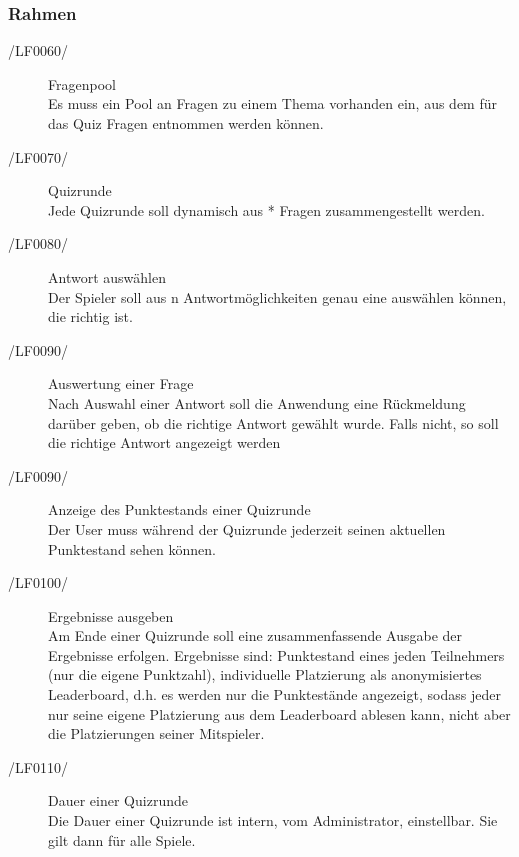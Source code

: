 \documentclass[11pt,a4paper]{scrreprt}
\begin{document}
\subsubsection{Rahmen}
\begin{description}
\item[/LF0060/] Fragenpool \\
Es muss ein Pool an Fragen zu einem Thema vorhanden ein, aus dem für das Quiz Fragen entnommen werden können.

\item[/LF0070/] Quizrunde \\
Jede Quizrunde soll dynamisch aus * Fragen zusammengestellt werden.

\item[/LF0080/] Antwort auswählen \\
Der Spieler soll aus n Antwortmöglichkeiten genau eine auswählen können, die richtig ist.
\item[/LF0090/]Auswertung einer Frage \\ 
Nach Auswahl einer Antwort soll die Anwendung eine Rückmeldung darüber geben, ob die richtige Antwort gewählt wurde. Falls nicht, so soll die richtige Antwort angezeigt werden

\item[/LF0090/]Anzeige des Punktestands einer Quizrunde \\ 
Der User muss während der Quizrunde jederzeit seinen aktuellen Punktestand sehen können.

\item[/LF0100/] Ergebnisse ausgeben \\
Am Ende einer Quizrunde soll eine zusammenfassende Ausgabe der Ergebnisse erfolgen. Ergebnisse sind: Punktestand eines jeden Teilnehmers (nur die eigene Punktzahl),  individuelle Platzierung als anonymisiertes Leaderboard, d.h. es werden nur die Punktestände angezeigt, sodass jeder nur seine eigene Platzierung aus dem Leaderboard ablesen kann, nicht aber die Platzierungen seiner Mitspieler.

\item[/LF0110/] Dauer einer Quizrunde \\
 Die Dauer einer Quizrunde ist intern, vom Administrator, einstellbar. Sie gilt dann für alle Spiele.
\end{description}
\end{document}
